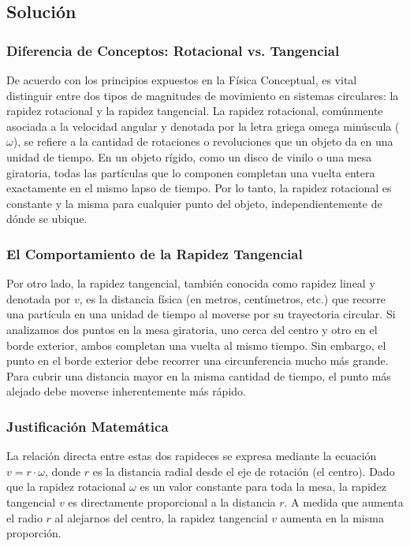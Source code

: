 \documentclass{article}
\begin{document}
\subsection*{Solución}

\subsubsection*{Diferencia de Conceptos: Rotacional vs. Tangencial}
De acuerdo con los principios expuestos en la Física Conceptual, es vital distinguir entre dos tipos de magnitudes de movimiento en sistemas circulares: la rapidez rotacional y la rapidez tangencial. La rapidez rotacional, comúnmente asociada a la velocidad angular y denotada por la letra griega omega minúscula ($\omega$), se refiere a la cantidad de rotaciones o revoluciones que un objeto da en una unidad de tiempo. En un objeto rígido, como un disco de vinilo o una mesa giratoria, todas las partículas que lo componen completan una vuelta entera exactamente en el mismo lapso de tiempo. Por lo tanto, la rapidez rotacional es constante y la misma para cualquier punto del objeto, independientemente de dónde se ubique.

\subsubsection*{El Comportamiento de la Rapidez Tangencial}
Por otro lado, la rapidez tangencial, también conocida como rapidez lineal y denotada por $v$, es la distancia física (en metros, centímetros, etc.) que recorre una partícula en una unidad de tiempo al moverse por su trayectoria circular. Si analizamos dos puntos en la mesa giratoria, uno cerca del centro y otro en el borde exterior, ambos completan una vuelta al mismo tiempo. Sin embargo, el punto en el borde exterior debe recorrer una circunferencia mucho más grande. Para cubrir una distancia mayor en la misma cantidad de tiempo, el punto más alejado debe moverse inherentemente más rápido.

\subsubsection*{Justificación Matemática}
La relación directa entre estas dos rapideces se expresa mediante la ecuación $v = r \cdot \omega$, donde $r$ es la distancia radial desde el eje de rotación (el centro). Dado que la rapidez rotacional $\omega$ es un valor constante para toda la mesa, la rapidez tangencial $v$ es directamente proporcional a la distancia $r$. A medida que aumenta el radio $r$ al alejarnos del centro, la rapidez tangencial $v$ aumenta en la misma proporción.
\end{document}

